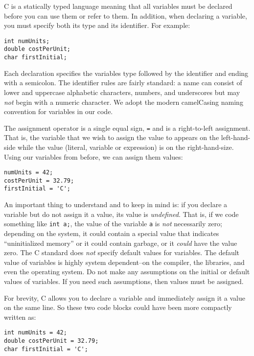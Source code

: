 C is a statically typed language meaning that all variables must be declared
before you can use them or refer to them.  In addition, when declaring a variable, 
you must specify both its type and its identifier.  For example:

\begin{verbatim}
int numUnits;
double costPerUnit;
char firstInitial;
\end{verbatim}

Each declaration specifies the variables type followed by the identifier and ending
with a semicolon.  The identifier rules are fairly standard: a name can consist
of lower and uppercase alphabetic characters, numbers, and underscores but
may \emph{not} begin with a numeric character.  We adopt the modern camelCasing
naming convention for variables in our code.

The assignment operator is a single equal sign, \texttt{=} and is a right-to-left
assignment.  That is, the variable that we wish to assign the value to appears on the
left-hand-side while the value (literal, variable or expression) is on the right-hand-size.
Using our variables from before, we can assign them values:

\begin{verbatim}
numUnits = 42;
costPerUnit = 32.79;
firstInitial = 'C';
\end{verbatim}

An important thing to understand and to keep in mind is: if you 
declare a variable but do not assign it a value, its value is \emph{undefined}.  
That is, if we code something like \texttt{int a;}, the value
of the variable \texttt{a} is \emph{not} necessarily zero; depending
on the system, it could contain a special value that indicates ``uninitialized
memory'' or it could contain garbage, or it \emph{could} have the value zero.
The C standard does \emph{not} specify default values for variables.  The
default value of variables is highly system dependent--on the compiler, the
libraries, and even the operating system.  Do not make any assumptions on 
the initial or default values of variables.  If you need such assumptions, then 
values must be assigned.

For brevity, C allows you to declare a variable and immediately assign it a value on the same
line.  So these two code blocks could have been more compactly written as:

\begin{verbatim}
int numUnits = 42;
double costPerUnit = 32.79;
char firstInitial = 'C';
\end{verbatim}

